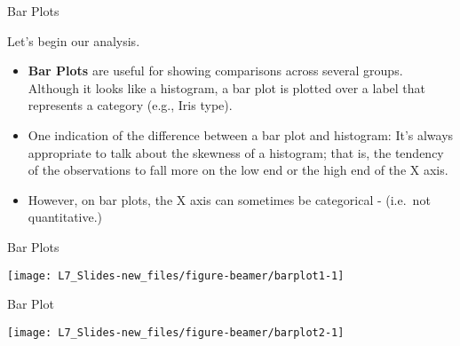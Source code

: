 \documentclass[ignorenonframetext,]{beamer}
\newenvironment{Shaded}{\begin{snugshade}}{\end{snugshade}}
\newcommand{\KeywordTok}[1]{\textcolor{white}{\textbf{{#1}}}}
\newcommand{\NormalTok}[1]{\textcolor{yellow}{{#1}}}
\newcommand{\DataTypeTok}[1]{\textcolor{yellow}{{#1}}}
\newcommand{\DecValTok}[1]{\textcolor{numbercolor}{{#1}}}
\newcommand{\StringTok}[1]{\textcolor{yellow}{{#1}}}
\begin{document}
\begin{frame}{Bar Plots}

Let's begin our analysis.

\begin{itemize}
\item
  \textbf{Bar Plots} are useful for showing comparisons across several
  groups. Although it looks like a histogram, a bar plot is plotted over
  a label that represents a category (e.g., Iris type).
\item
  One indication of the difference between a bar plot and histogram:
  It's always appropriate to talk about the skewness of a histogram;
  that is, the tendency of the observations to fall more on the low end
  or the high end of the X axis.
\item
  However, on bar plots, the X axis can sometimes be categorical -
  (i.e.~not quantitative.)
\end{itemize}

\end{frame}

\begin{frame}[fragile]{Bar Plots}

\small

\begin{Shaded}
\end{Shaded}

\begin{center}\texttt{[image: L7\_Slides-new\_files/figure-beamer/barplot1-1]} \end{center}

\end{frame}

\begin{frame}[fragile]{Bar Plot}

\small

\begin{Shaded}
\end{Shaded}

\begin{center}\texttt{[image: L7\_Slides-new\_files/figure-beamer/barplot2-1]} \end{center}

\end{frame}
\end{document}
